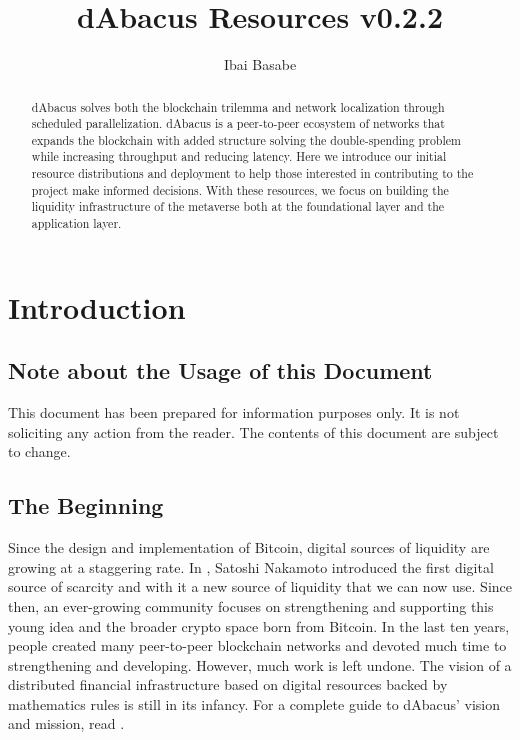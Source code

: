 \documentclass[12pt]{article}
\title{dAbacus Resources v0.2.2}
\author{Ibai Basabe}
\date{}           %
\begin{document}
\pagecolor{white}

\maketitle

\begin{abstract}

dAbacus solves both the blockchain trilemma and network localization through scheduled parallelization. dAbacus is a peer-to-peer ecosystem of networks that expands the blockchain with added structure solving the double-spending problem while increasing throughput and reducing latency. Here we introduce our initial resource distributions and deployment to help those interested in contributing to the project make informed decisions. With these resources, we focus on building the liquidity infrastructure of the metaverse both at the foundational layer and the application layer. 

\end{abstract}

\tableofcontents
\newpage



\section{Introduction}

\subsection{Note about the Usage of this Document}

This document has been prepared for information purposes only. It is not soliciting any action from the reader. The contents of this document are subject to change.

\subsection{The Beginning }

Since the design and implementation of Bitcoin, digital sources of liquidity are growing at a staggering rate. In \cite{N}, Satoshi Nakamoto introduced the first digital source of scarcity and with it a new source of liquidity that we can now use. Since then, an ever-growing community focuses on strengthening and supporting this young idea and the broader crypto space born from Bitcoin. In the last ten years, people created many peer-to-peer blockchain networks and devoted much time to strengthening and developing. However, much work is left undone. The vision of a distributed financial infrastructure based on digital resources backed by mathematics rules is still in its infancy. For a complete guide to dAbacus' vision and mission, read \cite{B}.
\end{document}
